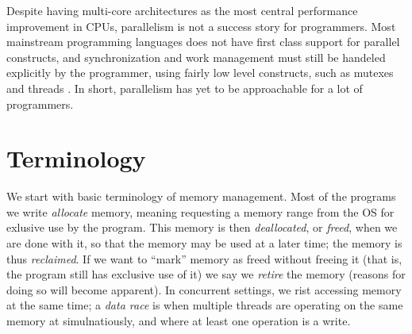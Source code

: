 \documentclass[a4paper,twoside]{report}
\begin{document}
Despite having multi-core architectures as the most central performance
improvement in CPUs, parallelism is not a success story for programmers.  Most
mainstream programming languages does not have first class support for parallel
constructs, and synchronization and work management must still be
handeled explicitly by the programmer, using fairly low level constructs, such
as mutexes and threads .
In short, parallelism has yet to be approachable for a lot of programmers.


\subsection*{}

\section{Terminology}
We start with basic terminology of memory management.  Most of the programs we
write \emph{allocate} memory, meaning requesting a memory range from the OS for
exlusive use by the program.  This memory is then \emph{deallocated}, or
\emph{freed}, when we are done with it, so that the memory may be used at a
later time; the memory is thus \emph{reclaimed}.  If we want to ``mark'' memory
as freed without freeing it (that is, the program still has exclusive use of
it) we say we \emph{retire} the memory (reasons for doing so will become
apparent).  In concurrent settings, we rist accessing memory at the same time;
a \emph{data race} is when multiple threads are operating on the same memory at
simulnatiously, and where at least one operation is a write.
\end{document}
